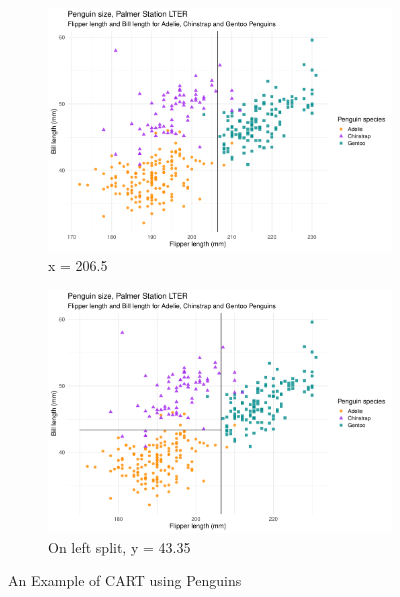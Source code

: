 \documentclass[11pt,a4paper]{report}
\begin{document}
\begin{figure}[H]
    \begin{subfigure}[b]{0.4\textwidth}
        \includegraphics[width=\textwidth]{presentation/plotpen1.pdf}
        \caption{x = 206.5}
        \label{fig:plotsplit1}
    \end{subfigure}
    \begin{subfigure}[b]{0.4\textwidth}
        \includegraphics[width=\textwidth]{presentation/plotpen2.pdf}
        \caption{On left split, y = 43.35}
        \label{fig:plotsplit2}
    \end{subfigure}
    \caption{An Example of CART using Penguins}\label{fig:Penguins}
\end{figure}
\end{document}
